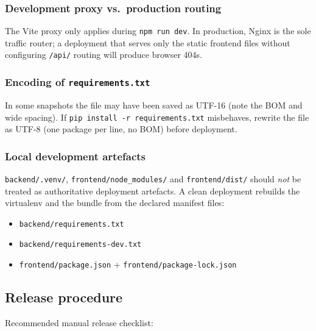 \documentclass[11pt,a4paper]{article}
\begin{document}
\subsubsection{Development proxy vs.\ production routing}
The Vite proxy only applies during \texttt{npm run dev}. In production,
Nginx is the sole traffic router; a deployment that serves only the static
frontend files without configuring \texttt{/api/} routing will produce
browser 404s.

\subsubsection{Encoding of \texttt{requirements.txt}}
In some snapshots the file may have been saved as UTF-16 (note the BOM and
wide spacing). If \texttt{pip install -r requirements.txt} misbehaves, rewrite
the file as UTF-8 (one package per line, no BOM) before deployment.

\subsubsection{Local development artefacts}
\texttt{backend/.venv/}, \texttt{frontend/node\_modules/} and
\texttt{frontend/dist/} should \emph{not} be treated as authoritative
deployment artefacts. A clean deployment rebuilds the virtualenv and the
bundle from the declared manifest files:

\begin{itemize}[leftmargin=1.6em]
  \item \texttt{backend/requirements.txt}
  \item \texttt{backend/requirements-dev.txt}
  \item \texttt{frontend/package.json} + \texttt{frontend/package-lock.json}
\end{itemize}

\subsection{Release procedure}
\label{subsec:release_procedure}

Recommended manual release checklist:
\end{document}
